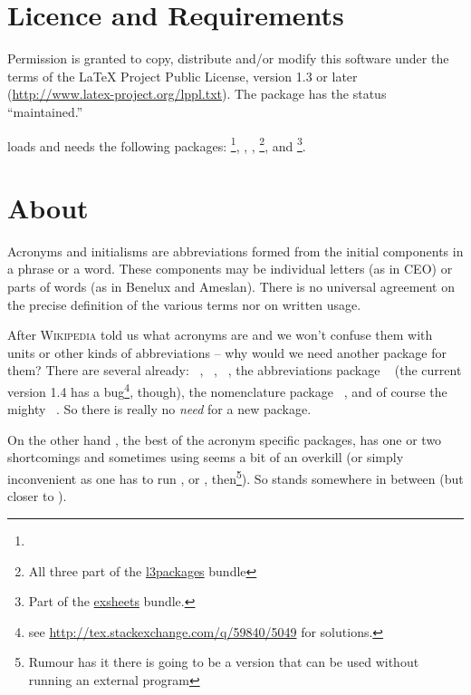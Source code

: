 \documentclass[DIV10,toc=index,toc=bib,hyperfootnotes=false]{cnpkgdoc}
\newcommand*\wikipedia{%
\textsc{Wikipedia}}
\providecommand*\CTANlink[1]{\href{http://www.ctan.org/pkg/#1}{#1}}
\begin{document}
\section{Licence and Requirements}
Permission is granted to copy, distribute and/or modify this software under the
terms of the \LaTeX{} Project Public License, version 1.3 or later
(\url{http://www.latex-project.org/lppl.txt}). The package has the status
``maintained.''

\acro loads and needs the following packages: \footnote{},
, , \footnote{All three part of
the \CTANlink{l3packages} bundle},  and %
\footnote{Part of the \CTANlink{exsheets} bundle.}.

\section{About}
\begin{zitat}
 Acronyms and initialisms are abbreviations formed from the initial components
 in a phrase or a word. These components may be individual letters (as in CEO)
 or parts of words (as in Benelux and Ameslan). There is no universal agreement
 on the precise definition of the various terms nor on written usage.
\end{zitat}
After \wikipedia{} told us what acronyms are and we won't confuse them with units
or other kinds of abbreviations -- why would we need another package for them?
There are several already: ~\cite{acronym}, %
~\cite{acromake}, ~\cite{acroterm}, the abbreviations package
~\cite{abbrevs} (the current version 1.4 has a bug\footnote{see
\url{http://tex.stackexchange.com/q/59840/5049} for solutions.}, though), the
nomenclature package ~\cite{nomencl}, and of course the mighty
~\cite{glossaries}. So there is really no \emph{need} for a
new package.

On the other hand , the best of the acronym specific packages,
has one or two shortcomings and sometimes using  seems a bit
of an overkill (or simply inconvenient as one has to run ,
 or , then\footnote{Rumour has it there is going to
be a version that can be used without running an external program}). So \acro
stands somewhere in between (but closer to ).
\end{document}
